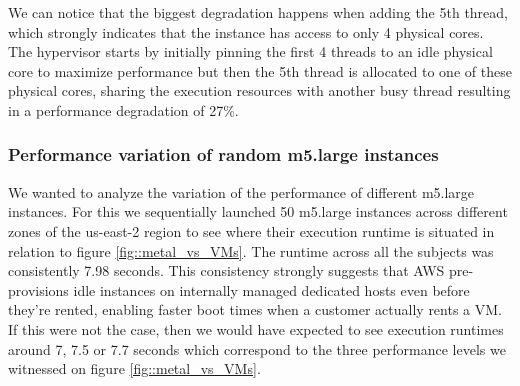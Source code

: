 \noindent
We can notice that the biggest degradation happens when adding the 5th thread, which strongly indicates 
that the instance has access to only 4 physical cores. The hypervisor starts by initially pinning the 
first 4 threads to an idle physical core to maximize performance but then the 5th thread is allocated 
to one of these physical cores, sharing the execution resources with another busy thread resulting in 
a performance degradation of 27\%.  \\
\subsubsection{Performance variation of random m5.large instances}
We wanted to analyze the variation of the performance of different m5.large instances. For this we 
sequentially launched 50 m5.large instances across different zones of the us-east-2 region to see where their 
execution runtime is situated in relation to figure \ref{fig::metal_vs_VMs}. The runtime across all the subjects
was consistently 7.98 seconds. This consistency strongly suggests that AWS pre-provisions idle instances on 
internally managed dedicated hosts even before they're rented, enabling faster boot times 
when a customer actually rents a VM. If this were not the case, then we would have expected to see 
execution runtimes around  7, 7.5 or 7.7 seconds which correspond to the three performance 
levels we witnessed on figure \ref{fig::metal_vs_VMs}. 

